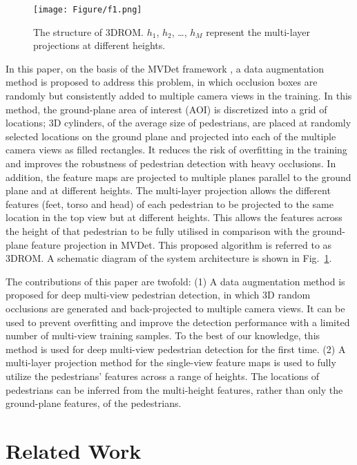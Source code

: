 \documentclass[runningheads]{llncs}
\begin{document}
	\begin{figure}[t]
		\centering
		\texttt{[image: Figure/f1.png]}
\caption{The structure of 3DROM. $h_1$, $h_2$, \dots, $h_M$ represent the multi-layer projections at different heights.}
		\label{f1}
	\end{figure}
	In this paper, on the basis of the MVDet framework \cite{hou2020multiview}, a data augmentation method is proposed to address this problem, in which occlusion boxes are randomly but consistently added to multiple camera views in the training. In this method, the ground-plane area of interest (AOI) is discretized into a grid of locations; 3D cylinders, of the average size of pedestrians, are placed at randomly selected locations on the ground plane and projected into each of the multiple camera views as filled rectangles. It reduces the risk of overfitting in the training and improves the robustness of pedestrian detection with heavy occlusions. In addition, the feature maps are projected to multiple planes parallel to the ground plane and at different heights.
	The multi-layer projection allows the different features (feet, torso and head) of each pedestrian to be projected to the same location in the top view but at different heights. This allows the features across the height of that pedestrian to be fully utilised in comparison with the ground-plane feature projection in MVDet. This proposed algorithm is referred to as 3DROM. A schematic diagram of the system architecture is shown in Fig.~\ref{f1}.
	
	The contributions of this paper are twofold:
	(1) A data augmentation method is proposed for deep multi-view pedestrian detection, in which 3D random occlusions are generated and back-projected to multiple camera views. It can be used to prevent overfitting and improve the detection performance with a limited number of multi-view training samples.
	To the best of our knowledge, this method is used for deep multi-view pedestrian detection for the first time.
(2) A multi-layer projection method for the single-view feature maps is used to fully utilize the pedestrians' features across a range of heights. The locations of pedestrians can be inferred from the multi-height features, rather than only the ground-plane features, of the pedestrians.
	


	\section{Related Work}
\end{document}
